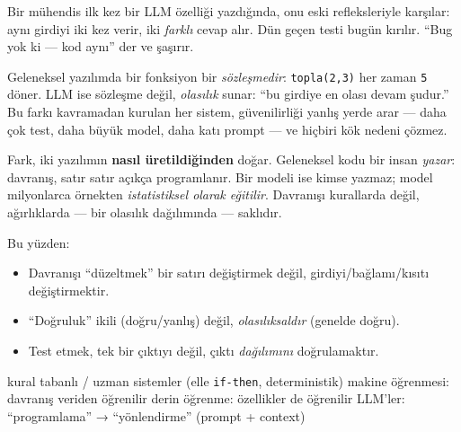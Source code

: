 

Bir mühendis ilk kez bir LLM özelliği yazdığında, onu eski refleksleriyle
karşılar: aynı girdiyi iki kez verir, iki \emph{farklı} cevap alır. Dün geçen
testi bugün kırılır. ``Bug yok ki --- kod aynı'' der ve şaşırır.


Geleneksel yazılımda bir fonksiyon bir \emph{sözleşmedir}: \texttt{topla(2,3)}
her zaman \texttt{5} döner. LLM ise sözleşme değil, \emph{olasılık} sunar: ``bu
girdiye en olası devam şudur.'' Bu farkı kavramadan kurulan her sistem,
güvenilirliği yanlış yerde arar --- daha çok test, daha büyük model, daha katı
prompt --- ve hiçbiri kök nedeni çözmez.

Fark, iki yazılımın \textbf{nasıl üretildiğinden} doğar. Geleneksel kodu bir
insan \emph{yazar}: davranış, satır satır açıkça programlanır. Bir modeli ise
kimse yazmaz; model milyonlarca örnekten \emph{istatistiksel olarak eğitilir}.
Davranışı kurallarda değil, ağırlıklarda --- bir olasılık dağılımında --- saklıdır.

Bu yüzden:
\begin{itemize}
  \item Davranışı ``düzeltmek'' bir satırı değiştirmek değil, girdiyi/bağlamı/kısıtı değiştirmektir.
  \item ``Doğruluk'' ikili (doğru/yanlış) değil, \emph{olasılıksaldır} (genelde doğru).
  \item Test etmek, tek bir çıktıyı değil, çıktı \emph{dağılımını} doğrulamaktır.
\end{itemize}

\begin{timeline}
 kural tabanlı / uzman sistemler (elle \texttt{if-then}, deterministik) \tlsep {} makine öğrenmesi: davranış veriden öğrenilir \tlsep {} derin öğrenme: özellikler de öğrenilir \tlsep {} LLM'ler: ``programlama'' → ``yönlendirme'' (prompt + context)
\end{timeline}

